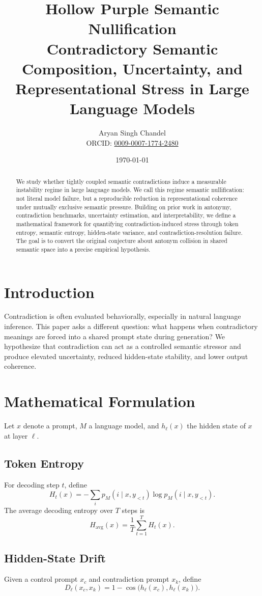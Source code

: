 \documentclass[11pt]{article}
\title{Hollow Purple Semantic Nullification\\\large Contradictory Semantic Composition, Uncertainty, and Representational Stress in Large Language Models}
\author{Aryan Singh Chandel\\\small ORCID: \href{https://orcid.org/0009-0007-1774-2480}{0009-0007-1774-2480}}
\date{\today}
\begin{document}
\maketitle

\begin{abstract}
We study whether tightly coupled semantic contradictions induce a measurable instability regime in large language models. We call this regime semantic nullification: not literal model failure, but a reproducible reduction in representational coherence under mutually exclusive semantic pressure. Building on prior work in antonymy, contradiction benchmarks, uncertainty estimation, and interpretability, we define a mathematical framework for quantifying contradiction-induced stress through token entropy, semantic entropy, hidden-state variance, and contradiction-resolution failure. The goal is to convert the original conjecture about antonym collision in shared semantic space into a precise empirical hypothesis.
\end{abstract}

\section{Introduction}
Contradiction is often evaluated behaviorally, especially in natural language inference. This paper asks a different question: what happens when contradictory meanings are forced into a shared prompt state during generation? We hypothesize that contradiction can act as a controlled semantic stressor and produce elevated uncertainty, reduced hidden-state stability, and lower output coherence.

\section{Mathematical Formulation}
Let $x$ denote a prompt, $M$ a language model, and $h_\ell(x)$ the hidden state of $x$ at layer $\ell$.

\subsection{Token Entropy}
For decoding step $t$, define
\[
H_t(x) = - \sum_i p_M(i \mid x, y_{<t}) \log p_M(i \mid x, y_{<t}).
\]
The average decoding entropy over $T$ steps is
\[
H_{\mathrm{avg}}(x) = \frac{1}{T} \sum_{t=1}^T H_t(x).
\]

\subsection{Hidden-State Drift}
Given a control prompt $x_c$ and contradiction prompt $x_k$, define
\[
D_\ell(x_c, x_k) = 1 - \cos\big(h_\ell(x_c), h_\ell(x_k)\big).
\]
\end{document}
